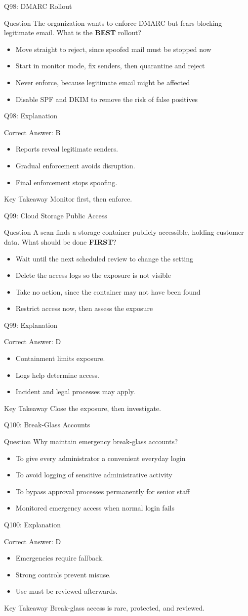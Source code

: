 \documentclass[aspectratio=169]{beamer}
\newcommand{\hq}[7]{%
	\begin{frame}{Q#1: #2}
		\begin{block}{Question}
			#3
		\end{block}
		\begin{itemize}
			#4
		\end{itemize}
	\end{frame}
	\begin{frame}{Q#1: Explanation}
		\begin{block}{Correct Answer: #5}
			\begin{itemize}
				#6
			\end{itemize}
		\end{block}
		\begin{alertblock}{Key Takeaway}
			#7
		\end{alertblock}
	\end{frame}
}
\begin{document}
	\hq{98}{DMARC Rollout}
	{The organization wants to enforce DMARC but fears blocking legitimate email. What is the \textbf{BEST} rollout?}
	{\item[\textbf{(A)}] Move straight to reject, since spoofed mail must be stopped now
		\item[\textbf{(B)}] Start in monitor mode, fix senders, then quarantine and reject
		\item[\textbf{(C)}] Never enforce, because legitimate email might be affected
		\item[\textbf{(D)}] Disable SPF and DKIM to remove the risk of false positives}
	{B}
	{\item Reports reveal legitimate senders.
		\item Gradual enforcement avoids disruption.
		\item Final enforcement stops spoofing.}
	{Monitor first, then enforce.}

	\hq{99}{Cloud Storage Public Access}
	{A scan finds a storage container publicly accessible, holding customer data. What should be done \textbf{FIRST}?}
	{\item[\textbf{(A)}] Wait until the next scheduled review to change the setting
		\item[\textbf{(B)}] Delete the access logs so the exposure is not visible
		\item[\textbf{(C)}] Take no action, since the container may not have been found
		\item[\textbf{(D)}] Restrict access now, then assess the exposure}
	{D}
	{\item Containment limits exposure.
		\item Logs help determine access.
		\item Incident and legal processes may apply.}
	{Close the exposure, then investigate.}

	\hq{100}{Break-Glass Accounts}
	{Why maintain emergency break-glass accounts?}
	{\item[\textbf{(A)}] To give every administrator a convenient everyday login
		\item[\textbf{(B)}] To avoid logging of sensitive administrative activity
		\item[\textbf{(C)}] To bypass approval processes permanently for senior staff
		\item[\textbf{(D)}] Monitored emergency access when normal login fails}
	{D}
	{\item Emergencies require fallback.
		\item Strong controls prevent misuse.
		\item Use must be reviewed afterwards.}
	{Break-glass access is rare, protected, and reviewed.}
\end{document}
